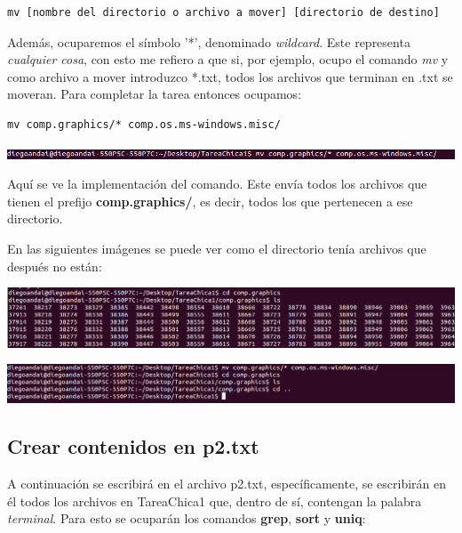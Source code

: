 \documentclass[a4paper,11pt]{article}
\theoremstyle{mytheor}
\begin{document}
\begin{lstlisting}
mv [nombre del directorio o archivo a mover] [directorio de destino]
\end{lstlisting}

Además, ocuparemos el símbolo '*', denominado \textit{wildcard}. Este representa \textit{cualquier cosa}, con esto me refiero a que si, por ejemplo, ocupo el comando \textit{mv} y como archivo a mover introduzco *.txt, todos los archivos que terminan en .txt se moveran. Para completar la tarea entonces ocupamos:

\begin{lstlisting}
mv comp.graphics/* comp.os.ms-windows.misc/
\end{lstlisting}

\begin{center}
\includegraphics[scale=0.47]{tc1_9.png}
\end{center}

Aquí se ve la implementación del comando. Este envía todos los archivos que tienen el prefijo \textbf{comp.graphics/}, es decir, todos los que pertenecen a ese directorio.

En las siguientes imágenes se puede ver como el directorio tenía archivos que después no están:

\begin{center}
\includegraphics[scale=0.4]{tc1_8.png}
\end{center}

\begin{center}
\includegraphics[scale=0.4]{tc1_9(2).png}
\end{center}

\subsection{Crear contenidos en p2.txt}

A continuación se escribirá en el archivo p2.txt, específicamente, se escribirán en él todos los archivos en TareaChica1 que, dentro de sí, contengan la palabra \textit{terminal}. Para esto se ocuparán los comandos \textbf{grep}, \textbf{sort} y \textbf{uniq}:
\end{document}
